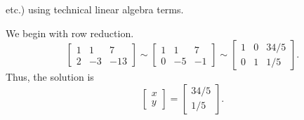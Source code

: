 \documentclass[letter]{article}
\newcommand{\mat}[1]{\begin{bmatrix}#1\end{bmatrix}}
\newenvironment{answer}{
	\begin{adjustwidth}{8mm}{} \vspace{2mm}}{\end{adjustwidth} \vspace{2mm}
}
\theoremstyle{plain}
\theoremstyle{definition}
\theoremstyle{remark}
\begin{document}
\begin{enumerate}
\begin{enumerate}
					etc.) using technical linear algebra terms.
				\begin{answer}
					We begin with row reduction. 
					\[
					\left[\begin{array}{cc|c}
					1 & 1 & 7 \\
					2 & -3 & -13
					\end{array}\right] \sim
					\left[\begin{array}{cc|c}
					1 & 1 & 7 \\
					0 & -5 & -1
					\end{array}\right] \sim
					\left[\begin{array}{cc|c}
					1 & 0 & 34/5 \\
					0 & 1 & 1/5
					\end{array}\right].
					\]
					Thus, the solution is 
					\[
					\mat{x\\y} = \mat{34/5 \\ 1/5}.
					\]
					

\end{answer}
\end{enumerate}
\end{enumerate}
\end{document}
